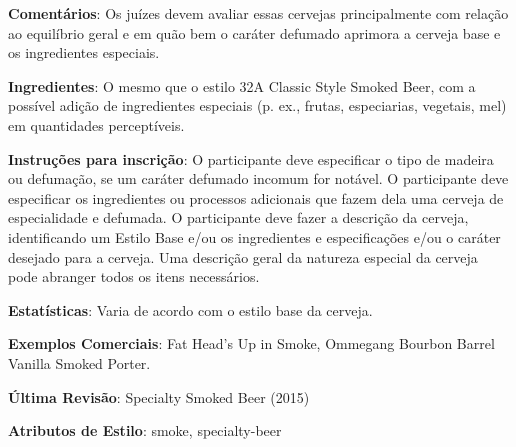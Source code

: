 \textbf{Comentários}: Os juízes devem avaliar essas cervejas principalmente com relação ao equilíbrio geral e em quão bem o caráter defumado aprimora a cerveja base e os ingredientes especiais.

\textbf{Ingredientes}: O mesmo que o estilo 32A Classic Style Smoked Beer, com a possível adição de ingredientes especiais (p. ex., frutas, especiarias, vegetais, mel) em quantidades perceptíveis.

\textbf{Instruções para inscrição}: O participante deve especificar o tipo de madeira ou defumação, se um caráter defumado incomum for notável. O participante deve especificar os ingredientes ou processos adicionais que fazem dela uma cerveja de especialidade e defumada. O participante deve fazer a descrição da cerveja, identificando um Estilo Base e/ou os ingredientes e especificações e/ou o caráter desejado para a cerveja. Uma descrição geral da natureza especial da cerveja pode abranger todos os itens necessários.

\textbf{Estatísticas}: Varia de acordo com o estilo base da cerveja.

\textbf{Exemplos Comerciais}: Fat Head’s Up in Smoke, Ommegang Bourbon Barrel Vanilla Smoked Porter.

\textbf{Última Revisão}: Specialty Smoked Beer (2015)

\textbf{Atributos de Estilo}: smoke, specialty-beer

